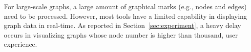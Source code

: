 
For large-scale graphs, a large amount of graphical marks (e.g., nodes and edges) need to be processed. However, most tools have a limited capability in displaying graph data in real-time. As reported in Section~\ref{sec:experiment}, a heavy delay occurs in visualizing graphs whose node number is higher than  thousand,   user experience.



